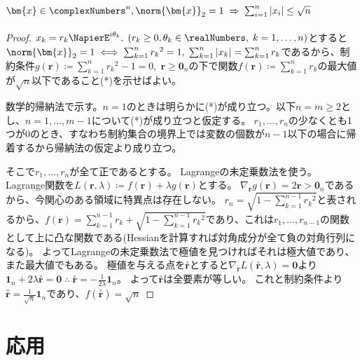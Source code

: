         \subsection{\texorpdfstring{$\bm{x}\in\complexNumbers^n,\norm{\bm{x}}_2=1\;\Rightarrow\;\sum_{i=1}^n{|x_i|}\leq\sqrt{n}$}{x∈C\string^n, ||x||\_2=1, ⇒ |x\_1|+...+|x\_n| ≦ √n}}
            \label{th:単位球面上の点の座標の絶対値の総和の最大値}
            \begin{proof}
                \quad\par
                $x_k = r_k \NapierE^{i\theta_k},\; (r_k \geq 0, \theta_k \in \realNumbers,\;k=1,\dotsc,n)$とすると$\norm{\bm{x}}_2=1 \iff \sum_{k=1}^n {r_k}^2 = 1,\;\sum_{k=1}^n{|x_k|} = \sum_{k=1}^n r_k$であるから、制約条件$g(\bm{r}) \coloneq \sum_{k=1}^n {r_k}^2 - 1 = 0,\;\bm{r} \geq \bm{0}_n$の下で関数$f(\bm{r}) \coloneq \sum_{k=1}^n r_k$の最大値が$\sqrt{n}$以下であること(*)を示せばよい。
                \par
                数学的帰納法で示す。$n=1$のときは明らかに(*)が成り立つ。以下$n=m\geq2$とし、$n=1,\dotsc,m-1$について(*)が成り立つと仮定する。
                $r_1,\dotsc,r_n$の少なくとも1つが0のとき、すなわち制約集合の境界上では変数の個数が$n-1$以下の場合に帰着するから帰納法の仮定より成り立つ。
                \par
                そこで$r_1,\dotsc,r_n$が全て正であるとする。
                Lagrangeの未定乗数法を使う。
                Lagrange関数を$L(\bm{r},\lambda)\coloneq f(\bm{r})+\lambda g(\bm{r})$とする。
                $\nabla_\bm{r}g(\bm{r}) = 2\bm{r} > \bm{0}_n$であるから、今関心のある領域に特異点は存在しない。
                $r_n = \sqrt{1 - \sum_{k=1}^{n-1} {r_k}^2}$と表されるから、$f(\bm{r}) = \sum_{k=1}^{n-1} r_k + \sqrt{1 - \sum_{k=1}^{n-1} {r_k}^2}$であり、これは$r_1,\dotsc,r_{n-1}$の関数として上に凸な関数である(Hessianを計算すれば対角成分が全て負の対角行列になる)。
                よってLagrangeの未定乗数法で極値を見つければそれは極大値であり、また最大値でもある。
                極値を与える点を$\overset{\circ}{\bm{r}}$とすると$\nabla_{\bm{r}}L(\overset{\circ}{\bm{r}},\lambda)=\bm{0}$より$\bm{1}_n + 2\lambda\overset{\circ}{\bm{r}}=\bm{0}\;\therefore\;\overset{\circ}{\bm{r}}=-\frac{1}{2\lambda}\bm{1}_n$。
                よって$\overset{\circ}{\bm{r}}$は全要素が等しい。
                これと制約条件より$\overset{\circ}{\bm{r}} = \frac{1}{\sqrt{n}}\bm{1}_n$であり、$f(\overset{\circ}{\bm{r}}) = \sqrt{n}$
            \end{proof}
    \section{応用}
